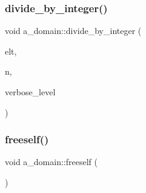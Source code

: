 \subsubsection{\texorpdfstring{divide\+\_\+by\+\_\+integer()}{divide\_by\_integer()}}
{\footnotesize\ttfamily void a\+\_\+domain\+::divide\+\_\+by\+\_\+integer (\begin{DoxyParamCaption}\item[{\mbox{\hyperlink{galois_8h_a09fddde158a3a20bd2dcadb609de11dc}{I\+NT}} $\ast$}]{elt,  }\item[{\mbox{\hyperlink{galois_8h_a09fddde158a3a20bd2dcadb609de11dc}{I\+NT}}}]{n,  }\item[{\mbox{\hyperlink{galois_8h_a09fddde158a3a20bd2dcadb609de11dc}{I\+NT}}}]{verbose\+\_\+level }\end{DoxyParamCaption})}

\mbox{\label{classa__domain_ab49f441e3ebbd34eed84e72c418adc1f}} 
\subsubsection{\texorpdfstring{freeself()}{freeself()}}
{\footnotesize\ttfamily void a\+\_\+domain\+::freeself (\begin{DoxyParamCaption}{ }\end{DoxyParamCaption})}

\mbox{\label{classa__domain_a155391ce053a94e6944573966511adb5}} 
